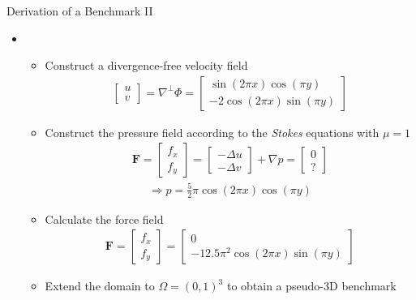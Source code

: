 \documentclass[aspectratio=43,t]{beamer}
\begin{document}
\begin{frame}{Derivation of a Benchmark II}
\begin{itemize}
\item[]
	\begin{itemize}
		\item Construct a divergence-free velocity field
			\begin{align*}
				\begin{bmatrix}
				u\\
				v
				\end{bmatrix}
				=\nabla^\perp\Phi=
				\begin{bmatrix}
				\sin(2\pi x)\cos(\pi y)\\
				-2\cos(2\pi x)\sin(\pi y)
				\end{bmatrix}
			\end{align*}
\pause
		\item Construct the pressure field according to the \textit{Stokes} equations with $\mu=1$
			\begin{align*}
				\bm{F}=
				\begin{bmatrix}
				f_x\\
				f_y
				\end{bmatrix}
				=
				\begin{bmatrix}
				-\Delta u\\
				-\Delta v
				\end{bmatrix}
				+ \nabla p =
				\begin{bmatrix}
				0\\
				?
				\end{bmatrix}
			\end{align*}
\pause
			\begin{align*}
				\Rightarrow p = \frac{5}{2}\pi\cos(2\pi x)\cos(\pi y)
			\end{align*}
\pause
		\item Calculate the force field
			\begin{align*}
				\bm{F}=
				\begin{bmatrix}
				f_x\\
				f_y
				\end{bmatrix}
				=
				\begin{bmatrix}
				0\\
				-12.5\pi^2\cos(2\pi x)\sin(\pi y)
				\end{bmatrix}
			\end{align*}
\pause			
		\item Extend the domain to $\Omega=(0,1)^3$ to obtain a pseudo-3D benchmark
	\end{itemize}
\end{itemize}
\end{frame}
\end{document}
